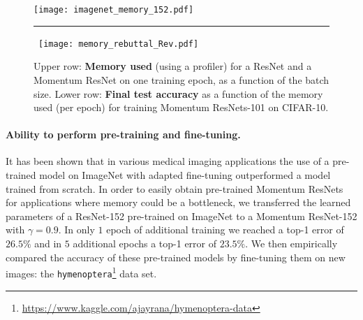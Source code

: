 \documentclass{article}
\begin{document}
 \begin{figure}[ht]
 \center  \texttt{[image: imagenet\_memory\_152.pdf]}
 \vspace{0.5em}
  \unskip\ \hrule\
  \texttt{[image: memory\_rebuttal\_Rev.pdf]}  \caption{Upper row: \textbf{Memory used} (using a profiler) for a ResNet and a Momentum ResNet on one training epoch, as a function of the batch size.  Lower row: \textbf{Final test accuracy} as a function of the memory used (per epoch) for training Momentum ResNets-101 on CIFAR-10.} 
 \label{fig:memory_time} 
 \end{figure}
\paragraph{Ability to perform pre-training and fine-tuning.}

It has been shown \citep{tajbakhsh2016convolutional} that in various medical imaging applications the use of a pre-trained model on ImageNet
with adapted fine-tuning outperformed a model trained from scratch. In order to easily obtain pre-trained Momentum ResNets for applications where memory could be a bottleneck, we transferred the learned parameters of a ResNet-152 pre-trained on ImageNet to a Momentum ResNet-152 with $\gamma=0.9$. In only $1$ epoch of additional training we reached a top-1 error of $26.5 \%$ and in $5$ additional epochs a top-1 error of $23.5 \%$. We then empirically compared the accuracy of these pre-trained models by fine-tuning them on new images: the \texttt{hymenoptera}\footnote{\href{url}{https://www.kaggle.com/ajayrana/hymenoptera-data}} data set. 
\end{document}
